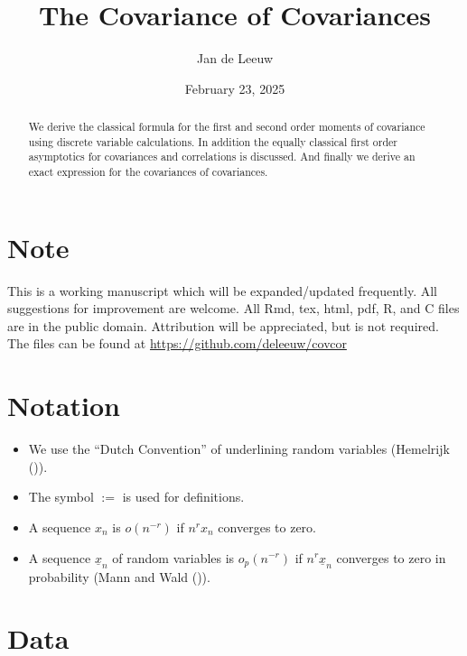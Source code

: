 \documentclass[
  12pt,
  letterpaper,
  DIV=11,
  numbers=noendperiod]{scrartcl}
\title{The Covariance of Covariances}
\author{Jan de Leeuw}
\date{February 23, 2025}
\providecommand{\tightlist}{%
  \setlength{\itemsep}{0pt}\setlength{\parskip}{0pt}}\usepackage{longtable,booktabs,array}
\newcommand{\sectionbreak}{\clearpage}
\newcommand{\ul}[1]{\underline{#1}}
\renewcommand*\contentsname{Table of contents}
\newcommand\contentsname{Table of contents}
\begin{document}
\maketitle
\begin{abstract}
We derive the classical formula for the first and second order moments
of covariance using discrete variable calculations. In addition the
equally classical first order asymptotics for covariances and
correlations is discussed. And finally we derive an exact expression for
the covariances of covariances.
\end{abstract}

\renewcommand*\contentsname{Table of contents}
{
\hypersetup{linkcolor=}
\setcounter{tocdepth}{3}
\tableofcontents
}

\sectionbreak

\section*{Note}\label{note}

This is a working manuscript which will be expanded/updated frequently.
All suggestions for improvement are welcome. All Rmd, tex, html, pdf, R,
and C files are in the public domain. Attribution will be appreciated,
but is not required. The files can be found at
\url{https://github.com/deleeuw/covcor}

\section*{Notation}\label{notation}

\begin{itemize}
\tightlist
\item
  We use the ``Dutch Convention'' of underlining random variables
  (Hemelrijk ()).
\item
  The symbol \(:=\) is used for definitions.
\item
  A sequence \(x_n\) is \(o(n^{-r})\) if \(n^rx_n\) converges to zero.
\item
  A sequence \(\ul{x}_n\) of random variables is \(o_p(n^{-r})\) if
  \(n^r\ul{x}_n\) converges to zero in probability (Mann and Wald
  ()).
\end{itemize}

\sectionbreak

\section{Data}\label{data}
\end{document}
